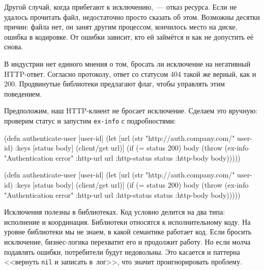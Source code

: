 \fi

Другой случай, когда прибегают к исключению,~--- отказ ресурса. Если не удалось
прочитать файл, недостаточно просто сказать об этом. Возможны десятки причин:
файла нет, он занят другим процессом, кончилось место на диске, ошибка в
кодировке. От ошибки зависит, кто ей займётся и как не допустить её
снова.


В индустрии нет единого мнения о том, бросать ли исключение на негативный
HTTP-ответ. Согласно протоколу, ответ со статусом 404 такой же верный, как и
200. Продвинутые библиотеки предлагают флаг, чтобы управлять этим поведением.

Предположим, наш HTTP-клиент не бросает исключение. Сделаем это вручную:
проверим статус и запустим \verb|ex-info| с подробностями:


\ifx\devicetype\mobile

\begin{english}
  \begin{clojure}
(defn authenticate-user [user-id]
  (let [url (str
              "http://auth.company.com/"
              user-id)
        {:keys [status body]}
        (client/get url)]
    (if (= status 200)
      body
      (throw (ex-info
               "Authentication error"
               {:http-url url
                :http-status status
                :http-body body})))))
  \end{clojure}
\end{english}

\else

\begin{english}
  \begin{clojure}
(defn authenticate-user [user-id]
  (let [url (str "http://auth.company.com/" user-id)
        {:keys [status body]} (client/get url)]
    (if (= status 200)
      body
      (throw (ex-info "Authentication error"
                      {:http-url url
                       :http-status status
                       :http-body body})))))
  \end{clojure}
\end{english}

\fi

Исключения полезны в библиотеках. Код условно делится на два типа: исполнение и
координация. Библиотеки относятся к исполнительному коду. На уровне библиотеки
мы не знаем, в какой семантике работает код. Если бросить исключение,
бизнес-логика перехватит его и продолжит работу. Но если молча подавлять ошибки,
потребители будут недовольны. Это касается и паттерна <<вернуть \verb|nil| и
записать в~лог>>, что значит проигнорировать проблему.

